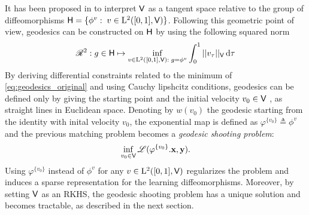 It has been proposed in \cite{miller2006geodesic} to interpret $\mathsf{V}$ as a tangent space relative to the group of diffeomorphisms $\mathsf{H}=\{ \phi^v:\; v\in \mathrm{L}^2([0,1],\mathsf{V})\}$.
Following this geometric point of view, geodesics can be constructed on $\mathsf{H}$ by using the following squared norm 
 \begin{equation}
  \label{eq:geodesics_original}
    \mathscr{R}^2: g\in \mathsf{H}\mapsto \inf_{ v\in \mathrm{L}^2([0,1],\mathsf{V}):\; g=\phi^v} \int_0^1 || v_\tau||_{\mathsf{V}}\mathop{}\!\mathrm{d} \tau
 \end{equation}
By deriving differential constraints related to the minimum of \eqref{eq:geodesics_original} and using Cauchy lipshcitz conditions, geodesics can be defined only by giving the starting point and the initial velocity $v_0\in \mathsf{V}$ \cite{miller2006geodesic}, as straight lines in Euclidean space.
Denoting by $w(v_0)$ the geodesic starting from the identity with inital velocity $v_0$, the exponential map is defined as $\varphi^{\{v_0\}}\triangleq \phi^v$ and the previous matching problem becomes a \textit{geodesic shooting problem}:
 \begin{equation}
  \label{eq:geodesics_shooting}
  \inf_{v_0 \in \mathsf{V}} \mathscr{L}(\varphi^{\{v_0\}}.\mathbf{x},\mathbf{y}).
 \end{equation}
 Using $\varphi^{\{v_0\}}$ instead of $\phi^v$ for any $v\in \mathrm{L}^2([0,1],\mathsf{V})$ regularizes the problem and induces a sparse representation for the learning diffeomorphisms.
 Moreover, by setting $\mathsf{V}$ as an RKHS, the geodesic shooting problem has a unique solution and becomes tractable, as described in the next section.




